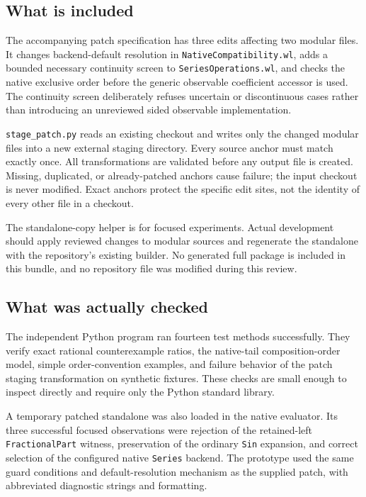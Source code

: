 \documentclass[11pt,letterpaper]{article}
\newcommand{\code}[1]{\nolinkurl{#1}}
\begin{document}
\subsection{What is included}
The accompanying patch specification has three edits affecting two modular
files. It changes backend-default resolution in \code{NativeCompatibility.wl},
adds a bounded necessary continuity screen to \code{SeriesOperations.wl}, and
checks the native exclusive order before the generic observable coefficient
accessor is used. The continuity screen deliberately refuses uncertain or
discontinuous cases rather than introducing an unreviewed sided observable
implementation.

\code{stage_patch.py} reads an existing checkout and writes only the changed
modular files into a new external staging directory. Every source anchor must
match exactly once. All transformations are validated before any output file
is created. Missing, duplicated, or already-patched anchors cause failure; the
input checkout is never modified. Exact anchors protect the specific edit
sites, not the identity of every other file in a checkout.

The standalone-copy helper is for focused experiments. Actual development
should apply reviewed changes to modular sources and regenerate the standalone
with the repository's existing builder. No generated full package is included
in this bundle, and no repository file was modified during this review.

\subsection{What was actually checked}
The independent Python program ran fourteen test methods successfully. They
verify exact rational counterexample ratios, the native-tail composition-order
model, simple order-convention examples, and failure behavior of the patch
staging transformation on synthetic fixtures. These checks are small enough
to inspect directly and require only the Python standard library.

A temporary patched standalone was also loaded in the native evaluator. Its
three successful focused observations were rejection of the retained-left
\code{FractionalPart} witness, preservation of the ordinary \code{Sin} expansion,
and correct selection of the configured native \code{Series} backend. The
prototype used the same guard conditions and default-resolution mechanism as
the supplied patch, with abbreviated diagnostic strings and formatting.
\end{document}
